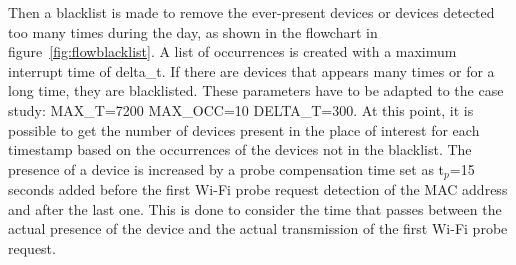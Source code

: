 
Then a blacklist is made to remove the ever-present devices or devices detected too many times during the day, as shown in the flowchart in figure~\ref{fig:flowblacklist}. A list of occurrences is created with a maximum interrupt time of delta\_t. If there are devices that appears many times or for a long time, they are blacklisted. These parameters have to be adapted to the case study: MAX\_T=7200 MAX\_OCC=10 DELTA\_T=300.
At this point, it is possible to get the number of devices present in the place of interest for each timestamp based on the occurrences of the devices not in the blacklist. The presence of a device is increased by a probe compensation time set as t$_{p}$=15 seconds added before the first Wi-Fi probe request detection of the MAC address and after the last one. This is done to consider the time that passes between the actual presence of the device and the actual transmission of the first Wi-Fi probe request.


